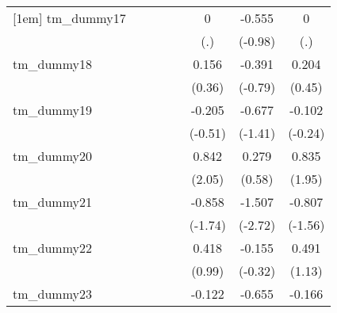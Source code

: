 {\begin{tabular}{l*{7}{c}}
[1em]
tm\_dummy17  &                     &                     &                     &                     &           0         &      -0.555         &           0         \\
            &                     &                     &                     &                     &         (.)         &     (-0.98)         &         (.)         \\
[1em]
tm\_dummy18  &                     &                     &                     &                     &       0.156         &      -0.391         &       0.204         \\
            &                     &                     &                     &                     &      (0.36)         &     (-0.79)         &      (0.45)         \\
[1em]
tm\_dummy19  &                     &                     &                     &                     &      -0.205         &      -0.677         &      -0.102         \\
            &                     &                     &                     &                     &     (-0.51)         &     (-1.41)         &     (-0.24)         \\
[1em]
tm\_dummy20  &                     &                     &                     &                     &       0.842\sym{*}  &       0.279         &       0.835         \\
            &                     &                     &                     &                     &      (2.05)         &      (0.58)         &      (1.95)         \\
[1em]
tm\_dummy21  &                     &                     &                     &                     &      -0.858         &      -1.507\sym{**} &      -0.807         \\
            &                     &                     &                     &                     &     (-1.74)         &     (-2.72)         &     (-1.56)         \\
[1em]
tm\_dummy22  &                     &                     &                     &                     &       0.418         &      -0.155         &       0.491         \\
            &                     &                     &                     &                     &      (0.99)         &     (-0.32)         &      (1.13)         \\
[1em]
tm\_dummy23  &                     &                     &                     &                     &      -0.122         &      -0.655         &      -0.166         \\

\end{tabular}}

